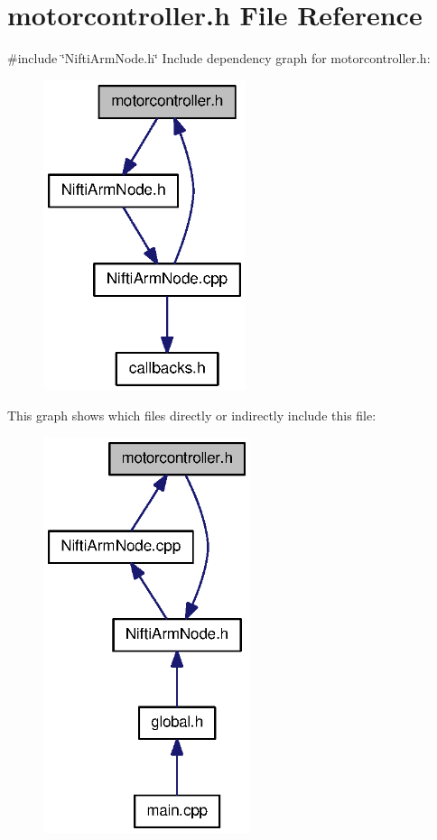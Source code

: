 \section{motorcontroller.\-h \-File \-Reference}
\label{motorcontroller_8h}
{\ttfamily \#include \char`\"{}\-Nifti\-Arm\-Node.\-h\char`\"{}}\*
\-Include dependency graph for motorcontroller.\-h\-:
\nopagebreak
\begin{figure}[H]
\begin{center}
\leavevmode
\includegraphics[width=168pt]{motorcontroller_8h__incl}
\end{center}
\end{figure}
\-This graph shows which files directly or indirectly include this file\-:
\nopagebreak
\begin{figure}[H]
\begin{center}
\leavevmode
\includegraphics[width=172pt]{motorcontroller_8h__dep__incl}
\end{center}
\end{figure}
